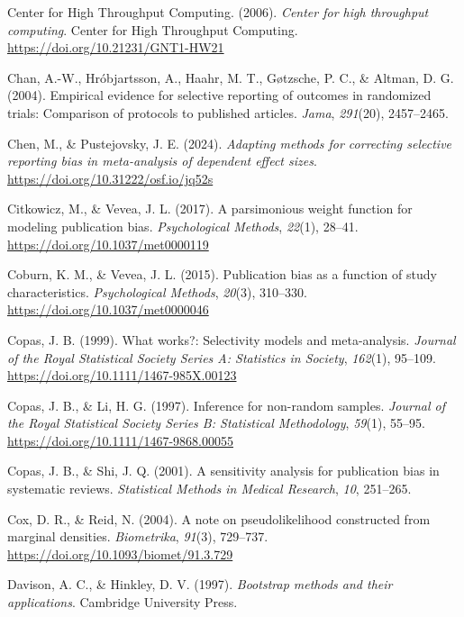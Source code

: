 \documentclass[
  man, donotrepeattitle,floatsintext]{apa7}
\newlength{\cslhangindent}
\newenvironment{CSLReferences}[2] %
 {\begin{list}{}{%
  \setlength{\itemindent}{0pt}
  \setlength{\leftmargin}{0pt}
  \setlength{\parsep}{0pt}
  \ifodd #1
   \setlength{\leftmargin}{\cslhangindent}
   \setlength{\itemindent}{-1\cslhangindent}
  \fi
  \setlength{\itemsep}{#2\baselineskip}}}
 {\end{list}}
\begin{document}
\begin{CSLReferences}{1}{0}
Center for High Throughput Computing. (2006). \emph{Center for high throughput computing}. Center for High Throughput Computing. \url{https://doi.org/10.21231/GNT1-HW21}

Chan, A.-W., Hróbjartsson, A., Haahr, M. T., Gøtzsche, P. C., \& Altman, D. G. (2004). Empirical evidence for selective reporting of outcomes in randomized trials: Comparison of protocols to published articles. \emph{Jama}, \emph{291}(20), 2457--2465.

Chen, M., \& Pustejovsky, J. E. (2024). \emph{Adapting methods for correcting selective reporting bias in meta-analysis of dependent effect sizes}. \url{https://doi.org/10.31222/osf.io/jq52s}

Citkowicz, M., \& Vevea, J. L. (2017). {A parsimonious weight function for modeling publication bias}. \emph{Psychological Methods}, \emph{22}(1), 28--41. \url{https://doi.org/10.1037/met0000119}

Coburn, K. M., \& Vevea, J. L. (2015). {Publication bias as a function of study characteristics}. \emph{Psychological Methods}, \emph{20}(3), 310--330. \url{https://doi.org/10.1037/met0000046}

Copas, J. B. (1999). What works?: {Selectivity} models and meta-analysis. \emph{Journal of the Royal Statistical Society Series A: Statistics in Society}, \emph{162}(1), 95--109. \url{https://doi.org/10.1111/1467-985X.00123}

Copas, J. B., \& Li, H. G. (1997). Inference for non-random samples. \emph{Journal of the Royal Statistical Society Series B: Statistical Methodology}, \emph{59}(1), 55--95. \url{https://doi.org/10.1111/1467-9868.00055}

Copas, J. B., \& Shi, J. Q. (2001). {A sensitivity analysis for publication bias in systematic reviews.} \emph{Statistical Methods in Medical Research}, \emph{10}, 251--265.

Cox, D. R., \& Reid, N. (2004). A note on pseudolikelihood constructed from marginal densities. \emph{Biometrika}, \emph{91}(3), 729--737. \url{https://doi.org/10.1093/biomet/91.3.729}

Davison, A. C., \& Hinkley, D. V. (1997). \emph{Bootstrap methods and their applications}. Cambridge University Press.


\end{CSLReferences}
\end{document}
